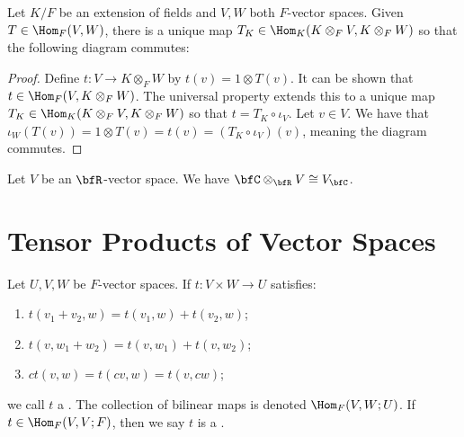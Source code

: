     \begin{theorem}
        Let $K/F$ be an extension of fields and $V,W$ both $F$-vector spaces. Given $T \in \Hom_F(V,W)$, there is a unique map $T_K \in \Hom_K(K \otimes_F V, K \otimes_F W)$ so that the following diagram commutes:
            \begin{center}
            \end{center}
    \end{theorem}
        \begin{proof}
            Define $t:V \rightarrow K \otimes_F W$ by $t(v) = 1 \otimes T(v)$. It can be shown that $t \in \Hom_F(V, K\otimes_F W)$. The universal property extends this to a unique map $T_K \in \Hom_K(K \otimes_F V, K\otimes_F W)$ so that $t = T_K \circ \iota_V$. Let $v \in V$. We have that $\iota_W(T(v)) = 1 \otimes T(v) = t(v) = (T_K \circ \iota_V)(v)$, meaning the diagram commutes.
        \end{proof}
    
    \begin{exercise}
        Let $V$ be an $\bfR$-vector space. We have $\bfC \otimes_\bfR V \cong V_\bfC$.
    \end{exercise}

\section{Tensor Products of Vector Spaces}
    \begin{definition}
        Let $U,V,W$ be $F$-vector spaces. If $t:V \times W \rightarrow U$ satisfies:
            \begin{enumerate}[label = (\arabic*)]
                \item ${t}\left(v_1+v_2, w\right)={t}\left(v_1, w\right)+{t}\left(v_2, w\right)$;
                \item ${t}\left(v, w_1+w_2\right)={t}\left(v, w_1\right)+{t}\left(v, w_2\right)$;
                \item ${ct}(v, w)={t}({c} v, w)={t}(v, {c} w)$;
            \end{enumerate}
        we call $t$ a . The collection of bilinear maps is denoted $\Hom_F(V,W;U)$. If $t \in \Hom_F(V,V;F)$, then we say $t$ is a .
    \end{definition}

